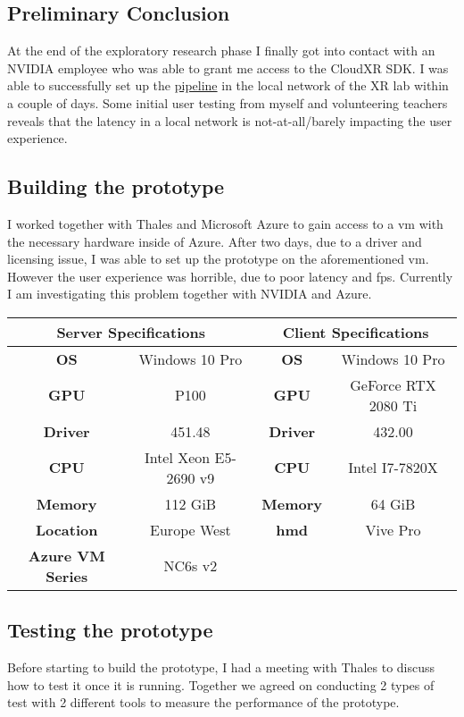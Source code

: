 \subsection{Preliminary Conclusion}
At the end of the exploratory research phase I finally got into contact with an NVIDIA employee who was able to grant me access to the CloudXR SDK. I was able to successfully set up the \hyperref[fig:pr0]{pipeline} in the local network of the XR lab within a couple of days. Some initial user testing from myself and volunteering teachers reveals that the latency in a local network is not-at-all/barely impacting the user experience.

\subsection{Building the prototype}
I worked together with Thales and Microsoft Azure to gain access to a \acrfull{vm} with the necessary hardware inside of Azure. After two days, due to a driver and licensing issue, I was able to set up the prototype on the aforementioned \acrshort{vm}. However the user experience was horrible, due to poor latency and \acrshort{fps}. Currently I am investigating this problem together with NVIDIA and Azure.

\begin{center}
\begin{tabular}{ |c|c|c|c| } 
\hline
\multicolumn{2}{|c|}{Server Specifications} & \multicolumn{2}{|c|}{Client Specifications}\\ 
\hline\hline
 \textbf{OS} & Windows 10 Pro &  \textbf{OS} & Windows 10 Pro\\ 
 \hline
 \textbf{GPU} & P100 & \textbf{GPU} & GeForce RTX 2080 Ti\\ 
 \hline
 \textbf{Driver} & 451.48 &  \textbf{Driver} & 432.00\\ 
 \hline
 \textbf{CPU} & Intel Xeon E5-2690 v9 & \textbf{CPU} & Intel I7-7820X\\
 \hline
 \textbf{Memory} & 112 GiB & \textbf{Memory} & 64 GiB\\
 \hline
 \textbf{Location} & Europe West & \textbf{\acrshort{hmd}} & Vive Pro\\
 \hline
 \textbf{Azure VM Series} & NC6s v2 & & \\
 \hline
\end{tabular}
\end{center}

\subsection{Testing the prototype}
Before starting to build the prototype, I had a meeting with Thales to discuss how to test it once it is running. Together we agreed on conducting 2 types of test with 2 different tools to measure the performance of the prototype.

